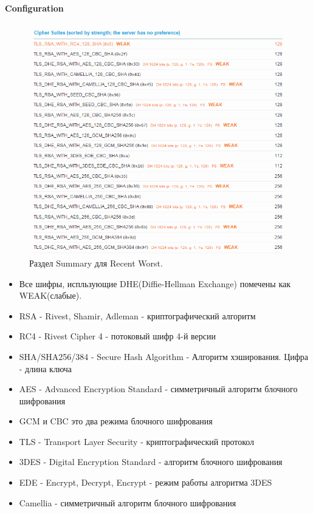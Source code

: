 \documentclass[a4paper, 14pt]{article}				%
\begin{document}
\paragraph{Configuration\\}
\begin{figure}[h!]
\centering
\includegraphics[width=\textwidth]{rsrc/lab7_fw_conf}
\caption{Раздел Summary для Recent Worst.}
\end{figure}
\begin{itemize}
\item{Все шифры, испльзующие DHE(Diffie-Hellman Exchange) помечены как WEAK(слабые).}
\item{RSA - Rivest, Shamir, Adleman - криптографический алгоритм}
\item{RC4 - Rivest Cipher 4 -  потоковый шифр 4-й версии}
\item{SHA/SHA256/384 - Secure Hash Algorithm - Алгоритм хэширования. Цифра - длина ключа}
\item{AES - Advanced Encryption Standard - симметричный алгоритм блочного шифрования}
\item{GCM и CBC это два режима блочного шифрования}
\item{TLS - Transport Layer Security - криптографический протокол}
\item{3DES - Digital Encryption Standard - алгоритм блочного шифрования}
\item{EDE - Encrypt, Decrypt, Encrypt - режим работы алгоритма 3DES}
\item{Camellia - симметричный алгоритм блочного шифрования}
\end{itemize}
\end{document}
